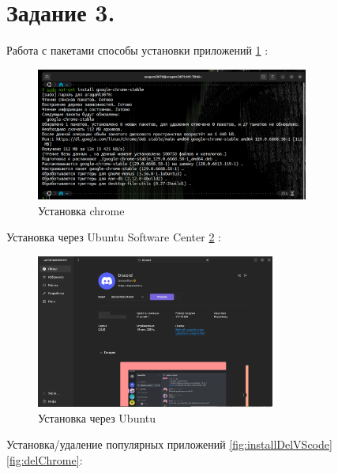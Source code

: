 \section{Задание 3.}

Работа с пакетами способы установки приложений \ref{fig:installChrome} :

\begin{figure}[!h]
    \centering
    \includegraphics[width = 0.8\textwidth]{images/installChrome.png}
    
    \caption{Установка chrome}
    
    \label{fig:installChrome}
\end{figure}

Установка через Ubuntu Software Center \ref{fig:installDiscord} :

\begin{figure}[!h]
    \centering
    \includegraphics[width = 0.7\textwidth]{images/installDiscord.png}
    
    \caption{Установка через Ubuntu}
    
    \label{fig:installDiscord}
\end{figure}

\newpage

Установка/удаление популярных приложений \ref{fig:installDelVScode} \ref{fig:delChrome}:

